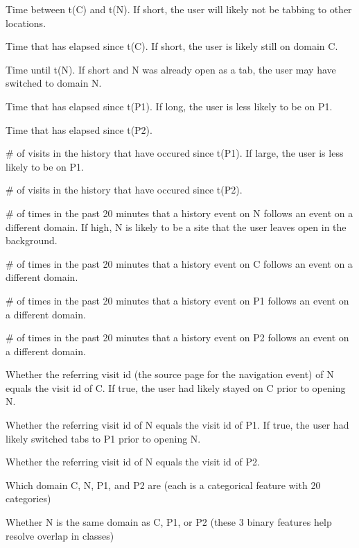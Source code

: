 \documentclass{sigchi}
\begin{document}
\begin{compactitem}
    \item Time between t(C) and t(N). If short, the user will likely not be tabbing to other locations.
    \item Time that has elapsed since t(C). If short, the user is likely still on domain C.
    \item Time until t(N). If short and N was already open as a tab, the user may have switched to domain N.
    \item Time that has elapsed since t(P1). If long, the user is less likely to be on P1.
    \item Time that has elapsed since t(P2).
    \item \# of visits in the history that have occured since t(P1). If large, the user is less likely to be on P1.
    \item \# of visits in the history that have occured since t(P2).
    \item \# of times in the past 20 minutes that a history event on N follows an event on a different domain. If high, N is likely to be a site that the user leaves open in the background.
    \item \# of times in the past 20 minutes that a history event on C follows an event on a different domain.
    \item \# of times in the past 20 minutes that a history event on P1 follows an event on a different domain.
    \item \# of times in the past 20 minutes that a history event on P2 follows an event on a different domain.
    \item Whether the referring visit id (the source page for the navigation event) of N equals the visit id of C. If true, the user had likely stayed on C prior to opening N.
    \item Whether the referring visit id of N equals the visit id of P1. If true, the user had likely switched tabs to P1 prior to opening N.
    \item Whether the referring visit id of N equals the visit id of P2.
    \item Which domain C, N, P1, and P2 are (each is a categorical feature with 20 categories)
    \item Whether N is the same domain as C, P1, or P2 (these 3 binary features help resolve overlap in classes)
\end{compactitem}
\end{document}
